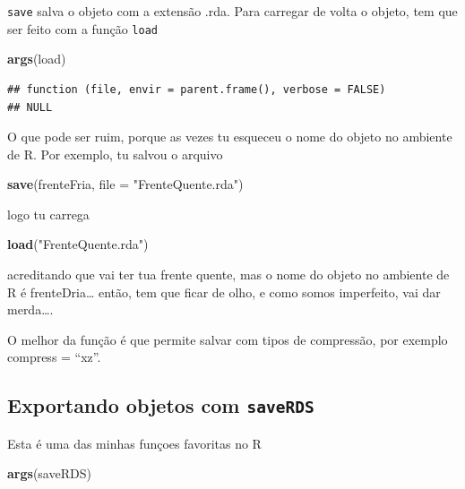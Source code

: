 \documentclass[]{book}
\newenvironment{Shaded}{\begin{snugshade}}{\end{snugshade}}
\newcommand{\KeywordTok}[1]{\textcolor[rgb]{0.13,0.29,0.53}{\textbf{#1}}}
\newcommand{\DataTypeTok}[1]{\textcolor[rgb]{0.13,0.29,0.53}{#1}}
\newcommand{\StringTok}[1]{\textcolor[rgb]{0.31,0.60,0.02}{#1}}
\newcommand{\NormalTok}[1]{#1}
\theoremstyle{definition}
\theoremstyle{definition}
\theoremstyle{definition}
\theoremstyle{remark}
\begin{document}
\texttt{save} salva o objeto com a extensão .rda. Para carregar de volta
o objeto, tem que ser feito com a função \texttt{load}

\begin{Shaded}
\begin{Highlighting}[]
\KeywordTok{args}\NormalTok{(load)}
\end{Highlighting}
\end{Shaded}

\begin{verbatim}
## function (file, envir = parent.frame(), verbose = FALSE) 
## NULL
\end{verbatim}

O que pode ser ruim, porque as vezes tu esqueceu o nome do objeto no
ambiente de R. Por exemplo, tu salvou o arquivo

\begin{Shaded}
\begin{Highlighting}[]
\KeywordTok{save}\NormalTok{(frenteFria, }\DataTypeTok{file =} \StringTok{"FrenteQuente.rda"}\NormalTok{)}
\end{Highlighting}
\end{Shaded}

logo tu carrega

\begin{Shaded}
\begin{Highlighting}[]
\KeywordTok{load}\NormalTok{(}\StringTok{"FrenteQuente.rda"}\NormalTok{)}
\end{Highlighting}
\end{Shaded}

acreditando que vai ter tua frente quente, mas o nome do objeto no
ambiente de R é frenteDria\ldots{} então, tem que ficar de olho, e como
somos imperfeito, vai dar merda\ldots{}.

O melhor da função é que permite salvar com tipos de compressão, por
exemplo compress = ``xz''.

\subsection{\texorpdfstring{Exportando objetos com
\texttt{saveRDS}}{Exportando objetos com saveRDS}}\label{exportando-objetos-com-saverds}

Esta é uma das minhas funçoes favoritas no R

\begin{Shaded}
\begin{Highlighting}[]
\KeywordTok{args}\NormalTok{(saveRDS)}
\end{Highlighting}
\end{Shaded}
\end{document}
